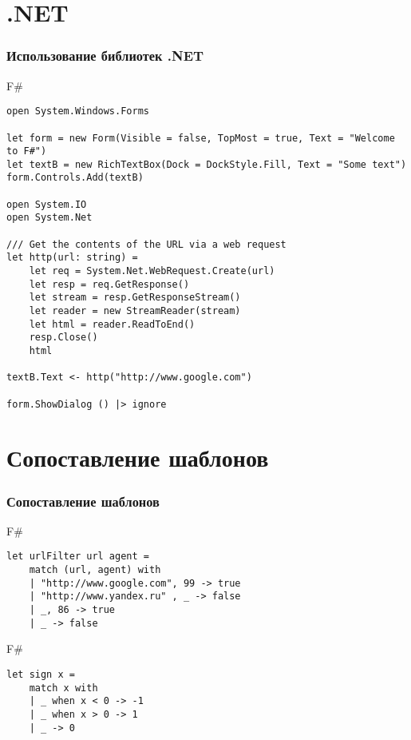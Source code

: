 \documentclass[xetex,mathserif,serif]{beamer}
\begin{document}
	\section{.NET}

	\begin{frame}[fragile]
		\frametitle{Использование библиотек .NET}
		\begin{exampleblock}{F\#}
			\begin{lstlisting}[basicstyle=\ttfamily\tiny]
open System.Windows.Forms

let form = new Form(Visible = false, TopMost = true, Text = "Welcome to F#")
let textB = new RichTextBox(Dock = DockStyle.Fill, Text = "Some text")
form.Controls.Add(textB)

open System.IO
open System.Net

/// Get the contents of the URL via a web request
let http(url: string) =
    let req = System.Net.WebRequest.Create(url)
    let resp = req.GetResponse()
    let stream = resp.GetResponseStream()
    let reader = new StreamReader(stream)
    let html = reader.ReadToEnd()
    resp.Close()
    html

textB.Text <- http("http://www.google.com")

form.ShowDialog () |> ignore
           \end{lstlisting}
       \end{exampleblock}
\end{frame}

	\section{Сопоставление шаблонов}
	
	\begin{frame}[fragile]
		\frametitle{Сопоставление шаблонов}
\begin{exampleblock}{F\#}
\begin{lstlisting}
let urlFilter url agent =
    match (url, agent) with
    | "http://www.google.com", 99 -> true
    | "http://www.yandex.ru" , _ -> false
    | _, 86 -> true
    | _ -> false
\end{lstlisting}
\end{exampleblock}

\begin{exampleblock}{F\#}
\begin{lstlisting}
let sign x =
    match x with
    | _ when x < 0 -> -1
    | _ when x > 0 -> 1
    | _ -> 0
\end{lstlisting}
\end{exampleblock}
\end{frame}
\end{document}
